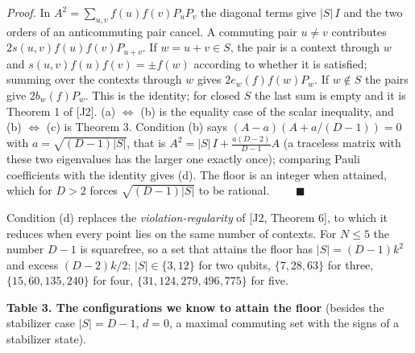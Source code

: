 \documentclass[11pt,a4paper]{article}
\newcommand{\gt}{>}
\begin{document}
\emph{Proof.} In \(A^2 = \sum_{u,v} f(u)f(v)P_uP_v\) the diagonal terms give \(|S|\,I\) and the two orders of an
anticommuting pair cancel. A commuting pair \(u \ne v\) contributes \(2 s(u,v) f(u) f(v) P_{u+v}\). If
\(w = u+v \in S\), the pair is a context through \(w\) and \(s(u,v)f(u)f(v) = \pm f(w)\) according to whether it
is satisfied; summing over the contexts through \(w\) gives \(2 e_w(f) f(w) P_w\). If \(w \notin S\) the pairs
give \(2 b_w(f) P_w\). This is the identity; for closed \(S\) the last sum is empty and it is Theorem 1 of
{[}J2{]}. (a) \(\Leftrightarrow\) (b) is the equality case of the scalar inequality, and (b) \(\Leftrightarrow\) (c)
is Theorem 3. Condition (b) says \((A - a)(A + a/(D-1)) = 0\) with \(a = \sqrt{(D-1)|S|}\), that is
\(A^2 = |S|\,I + \tfrac{a(D-2)}{D-1} A\) (a traceless matrix with these two eigenvalues has the larger one
exactly once); comparing Pauli coefficients with the identity gives (d). The floor is an integer when
attained, which for \(D \gt 2\) forces \(\sqrt{(D-1)|S|}\) to be rational. \(\qquad\blacksquare\)

Condition (d) replaces the \emph{violation-regularity} of {[}J2, Theorem 6{]}, to which it reduces when every
point lies on the same number of contexts. For \(N \le 5\) the number \(D - 1\) is squarefree, so a set that
attains the floor has \(|S| = (D-1)k^2\) and excess \((D-2)k/2\): \(|S| \in \{3, 12\}\) for two qubits,
\(\{7, 28, 63\}\) for three, \(\{15, 60, 135, 240\}\) for four, \(\{31, 124, 279, 496, 775\}\) for five.

\textbf{Table 3. The configurations we know to attain the floor} (besides the stabilizer case
\(|S| = D-1\), \(d = 0\), a maximal commuting set with the signs of a stabilizer state).
\end{document}
